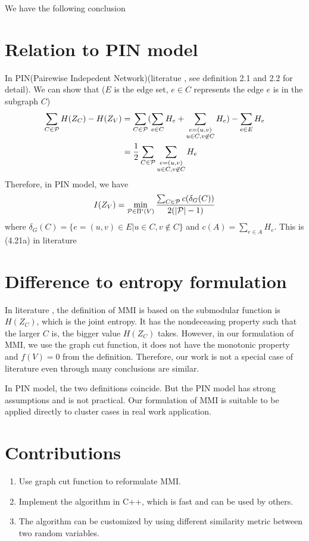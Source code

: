 \documentclass{article}
\def\P{\mathcal{P}}
\DeclarePairedDelimiter\abs{\lvert}{\rvert}
\theoremstyle{definition}
\begin{document}
We have the following conclusion
\section{Relation to PIN model}
In PIN(Pairewise Indepedent Network)(literatue \cite{pin}, see definition 2.1 and 2.2 for detail).
We can show that ($E$ is the edge set, $e \in C$ represents the edge $e$ is in the subgraph $C$)
\begin{align*}
\sum_{C \in \P} H(Z_C) - H(Z_V) & = \sum_{C \in \P} (\sum_{e \in C} H_e + \sum_{\substack{e = (u,v) \\ u \in C, v\not\in C }} H_e) - \sum_{e \in E} H_e \\
& = {1 \over 2}\sum_{C \in \P}  \sum_{\substack{e = (u,v) \\ u \in C, v\not\in C }} H_e
\end{align*}
Therefore, in PIN model, we have
\begin{equation}
I(Z_V) = \min_{ \P \in \Pi'(V)} \frac{ \sum_{C \in \P} c(\delta_{G}(C))}{2(\abs{\P} - 1 )}
\end{equation}
where $\delta_{G}(C) = \{e = (u, v) \in E | u \in C, v \not\in C\} $ and $c(A) = \sum_{e\in A} H_e$.
This is (4.21a) in literature \cite{ic}
\section{Difference to entropy formulation}
In literature \cite{ic}, the definition of MMI is based on the submodular function is $H(Z_C)$, which is the joint entropy. It has the nondeceasing property such that the larger $C$ is, the bigger value $H(Z_C)$ takes. However, in our formulation of MMI, we use the graph cut function, it does not have the monotonic property and $f(V) = 0$ from the definition. Therefore, our work is not a special case of literature \cite{ic} even through many conclusions are similar.

In PIN model, the two definitions coincide. But the PIN model has strong assumptions and is not practical. Our formulation of MMI is suitable to be applied directly to cluster cases in real work application.
\section{Contributions}
\begin{enumerate}
\item Use graph cut function to reformulate MMI.
\item Implement the algorithm in C++, which is fast and can be used by others.
\item The algorithm can be customized by using different similarity metric between two random variables.
\end{enumerate}
\appendix
\end{document}
